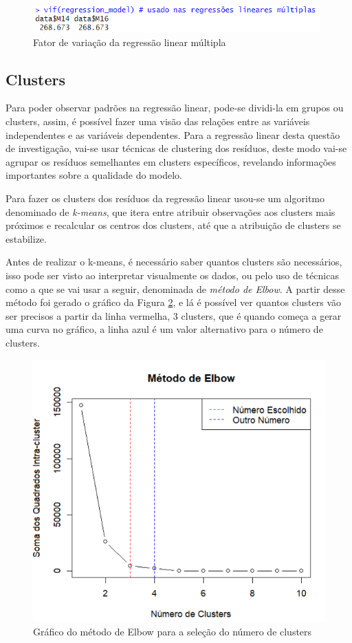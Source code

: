 \documentclass[%
 aip,
cp,  %
 amsmath,amssymb,%
 reprint,%
]{revtex4-2}
\begin{document}
\begin{figure}[!h]
    \centering
    \includegraphics[width=11cm]{imagens/questao4/vif.png}
    \caption{Fator de variação da regressão linear múltipla}
    \label{questao4VIF}
\end{figure}


\vspace{2cm}

\subsection{Clusters}
Para poder observar padrões na regressão linear, pode-se dividi-la em grupos ou clusters, assim, é possível fazer uma visão das relações entre as variáveis independentes e as variáveis dependentes. Para a regressão linear desta questão de investigação, vai-se usar técnicas de clustering dos resíduos, deste modo vai-se agrupar os resíduos semelhantes em clusters específicos, revelando informações importantes sobre a qualidade do modelo.

Para fazer os clusters dos resíduos da regressão linear usou-se um algoritmo denominado de \textit{k-means}, que itera entre atribuir observações aos clusters mais próximos e recalcular os centros dos clusters, até que a atribuição de clusters se estabilize.

Antes de realizar o k-means, é necessário saber quantos clusters são necessários, isso pode ser visto ao interpretar visualmente os dados, ou pelo uso de técnicas como a que se vai usar a seguir, denominada de \textit{método de  Elbow}. A partir desse método foi gerado o gráfico da Figura \ref{fig:ElbowMethod}, e lá é possível ver quantos clusters vão ser precisos a partir da linha vermelha, 3 clusters, que é quando começa a gerar uma curva no gráfico, a linha azul é um valor alternativo para o número de clusters.

\begin{figure}[!h]
    \centering
    \includegraphics[width=0.6\linewidth]{imagens//questao4/elbowPlot.png}
    \caption{Gráfico do método de Elbow para a seleção do número de clusters }
    \label{fig:ElbowMethod}
\end{figure}
\end{document}
